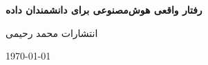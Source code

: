 
\begin{titlepage}
    \begin{center}
        \vspace*{5cm}

        {
        {\huge \textbf{رفتار واقعی هوش‌مصنوعی برای دانشمندان داده}}
        }


        \vspace{0.5cm}


        \LARGE انتشارات محمد رحیمی

        \large{\today}

    \end{center}
\end{titlepage}